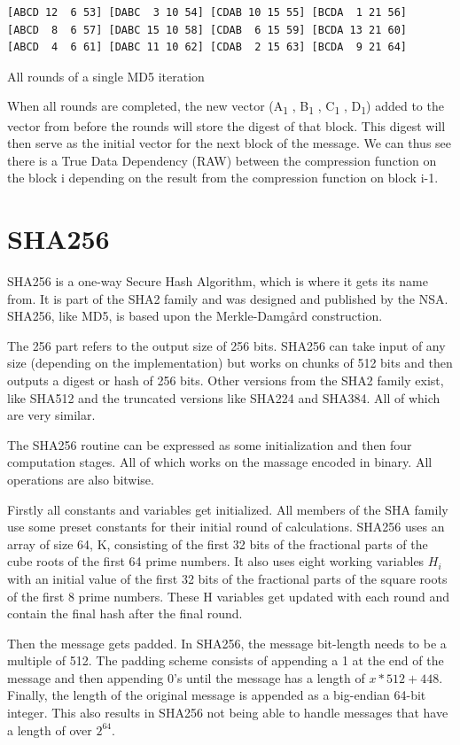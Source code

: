 \documentclass[a4paper, openany]{book}
\begin{document}
\begin{abstact}
\begin{table}[H]
\begin{BVerbatim}[fontsize=\tiny]
[ABCD 12  6 53] [DABC  3 10 54] [CDAB 10 15 55] [BCDA  1 21 56]
[ABCD  8  6 57] [DABC 15 10 58] [CDAB  6 15 59] [BCDA 13 21 60]
[ABCD  4  6 61] [DABC 11 10 62] [CDAB  2 15 63] [BCDA  9 21 64]
\end{BVerbatim}
\caption{All rounds of a single MD5 iteration}
\label{fig:MD5Rounds}
\end{table}
When all rounds are completed, the new vector (A\textsubscript{1} , B\textsubscript{1} , C\textsubscript{1} , D\textsubscript{1}) added to the vector from before the rounds will store the digest of that block. This digest will then serve as the initial vector for the next block of the message. We can thus see there is a True Data Dependency (RAW) between the compression function on the block i depending on the result from the compression function on block i-1.
\section{SHA256}
\label{SHAalg}
SHA256 is a one-way Secure Hash Algorithm, which is where it gets its name from.
It is part of the SHA2 family and was designed and published by the NSA.
SHA256, like MD5, is based upon the Merkle-Damgård construction.

The 256 part refers to the output size of 256 bits.
SHA256 can take input of any size (depending on the implementation) but works
on chunks of 512 bits and then outputs a digest or hash of 256 bits.
Other versions from the SHA2 family exist, like SHA512 and the truncated
versions like SHA224 and SHA384. All of which are very similar.

The SHA256 routine can be expressed as some initialization and then four computation stages.
All of which works on the massage encoded in binary. All operations are also bitwise.

Firstly all constants and variables get initialized. All members of the SHA family use some preset constants for their initial round of calculations.
SHA256 uses an array of size 64, K, consisting of the first 32 bits of the fractional parts of the cube roots of the first 64 prime numbers.
It also uses eight working variables \(H_i\) with an initial value of the first 32 bits of the fractional parts of the square roots of the first 8 prime numbers.
These H variables get updated with each round and contain the final hash after the final round.

Then the message gets padded. In SHA256, the message bit-length needs to be a multiple of 512.
The padding scheme consists of appending a 1 at the end of the message and then appending 0's until the message has a length of \(x*512+448\).
Finally, the length of the original message is appended as a big-endian 64-bit integer.
This also results in SHA256 not being able to handle messages that have a length of over \(2^{64}\).


\end{abstact}
\end{document}

